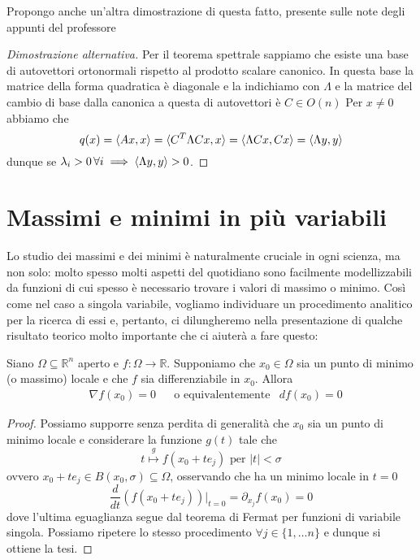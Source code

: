 \documentclass[openany, italian]{book}
\begin{document}
Propongo anche un'altra dimostrazione di questa fatto, presente sulle note degli appunti del professore
\begin{proof}[Dimostrazione alternativa]
Per il teorema spettrale sappiamo che esiste una base di autovettori ortonormali rispetto al prodotto scalare canonico. In questa base la matrice della forma quadratica è diagonale e la indichiamo con $\Lambda$ e la matrice del cambio di base dalla canonica a questa di autovettori è $C \in O(n)$ Per $x \neq 0$ abbiamo che
$$
q(x) = \langle Ax, x \rangle = \langle C^T \Lambda C x, x \rangle = \langle \Lambda Cx, Cx \rangle = \langle \Lambda y, y \rangle
$$
dunque se $\lambda_i > 0 \, \forall i \implies \langle \Lambda y, y \rangle > 0$.
\end{proof}
\section{Massimi e minimi in più variabili}
Lo studio dei massimi e dei minimi è naturalmente cruciale in ogni scienza, ma non solo: molto spesso molti aspetti del quotidiano sono facilmente modellizzabili da funzioni di cui spesso è necessario trovare i valori di massimo o minimo. Così come nel caso a singola variabile, vogliamo individuare un procedimento analitico per la ricerca di essi e, pertanto, ci dilungheremo nella presentazione di qualche risultato teorico molto importante che ci aiuterà a fare questo:
\begin{theorem}
Siano $\Omega \subseteq \mathbb{R}^n$ aperto e $f: \Omega \to \mathbb{R}$. Supponiamo che $x_0 \in \Omega$ sia un punto di minimo (o massimo) locale e che $f$ sia differenziabile in $x_0$. Allora
\begin{align*}
&\nabla{f(x_0)} = 0 & &\text{o equivalentemente} &df(x_0) = 0 
\end{align*}
\end{theorem}
\begin{proof}
Possiamo supporre senza perdita di generalità che $x_0$ sia un punto di minimo locale e considerare la funzione $g(t)$ tale che
$$
t \stackrel{g}{\mapsto} f(x_0 + te_j) \text{ per } |t| < \sigma
$$
ovvero $x_0 + te_j \in B(x_0, \sigma) \subseteq \Omega$, osservando che ha un minimo locale in $t=0$
$$
\frac{d}{dt} \left( f(x_0 + te_j) \right){\big|_{t=0}} = \partial_{x_j} f(x_0) = 0
$$
dove l'ultima eguaglianza segue dal teorema di Fermat per funzioni di variabile singola. Possiamo ripetere lo stesso procedimento $\forall j \in \{1, \ldots n \}$ e dunque si ottiene la tesi.
\end{proof}
\end{document}
